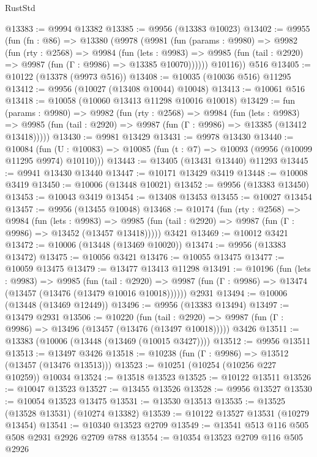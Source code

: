 \begin{lexlean}{RustStd}
\begin{coremodule}
@13383 := @9994 @13382
@13385 := @9956 (@13383 @10023)
@13402 := @9955
    (fun (fn : @86) =>
    @13380
      (@9978
        (@9981
          (fun (params : @9980) =>
          @9982
            (fun (rty : @2568) =>
            @9984
              (fun (lets : @9983) =>
              @9985 (fun (tail : @2920) => @9987 (fun (Γ : @9986) => @13385 @10070))))))
        @10116))
    @516
@13405 := @10122 (@13378 (@9973 @516))
@13408 := @10035 (@10036 @516) @11295
@13412 := @9956 (@10027 (@13408 @10044) @10048)
@13413 := @10061 @516
@13418 := @10058 (@10060 @13413 @11298 @10016 @10018)
@13429 := fun (params : @9980) =>
  @9982
    (fun (rty : @2568) =>
    @9984
      (fun (lets : @9983) =>
      @9985 (fun (tail : @2920) => @9987 (fun (Γ : @9986) => @13385 (@13412 @13418)))))
@13430 := @9981 @13429
@13431 := @9978 @13430
@13440 := @10084
    (fun (U : @10083) => @10085 (fun (t : @7) => @10093 (@9956 (@10099 @11295 @9974) @10110)))
@13443 := @13405 (@13431 @13440) @11293
@13445 := @9941 @13430 @13440
@13447 := @10171 @13429 @3419
@13448 := @10008 @3419
@13450 := @10006 (@13448 @10021)
@13452 := @9956 (@13383 @13450)
@13453 := @10043 @3419
@13454 := @13408 @13453
@13455 := @10027 @13454
@13457 := @9956 (@13455 @10048)
@13468 := @10174
    (fun (rty : @2568) =>
    @9984
      (fun (lets : @9983) =>
      @9985 (fun (tail : @2920) => @9987 (fun (Γ : @9986) => @13452 (@13457 @13418)))))
    @3421
@13469 := @10012 @3421
@13472 := @10006 (@13448 (@13469 @10020))
@13474 := @9956 (@13383 @13472)
@13475 := @10056 @3421
@13476 := @10055 @13475
@13477 := @10059 @13475
@13479 := @13477 @13413 @11298
@13491 := @10196
    (fun (lets : @9983) =>
    @9985
      (fun (tail : @2920) =>
      @9987 (fun (Γ : @9986) => @13474 (@13457 (@13476 (@13479 @10016 @10018))))))
    @2931
@13494 := @10006 (@13448 (@13469 @12449))
@13496 := @9956 (@13383 @13494)
@13497 := @13479 @2931
@13506 := @10220
    (fun (tail : @2920) => @9987 (fun (Γ : @9986) => @13496 (@13457 (@13476 (@13497 @10018)))))
    @3426
@13511 := @13383 (@10006 (@13448 (@13469 (@10015 @3427))))
@13512 := @9956 @13511
@13513 := @13497 @3426
@13518 := @10238 (fun (Γ : @9986) => @13512 (@13457 (@13476 @13513)))
@13523 := @10251 (@10254 (@10256 @227 @10259)) @10034
@13524 := @13518 @13523
@13525 := @10122 @13511
@13526 := @10047 @13523
@13527 := @13455 @13526
@13528 := @9956 @13527
@13530 := @10054 @13523 @13475
@13531 := @13530 @13513
@13535 := @13525 (@13528 @13531) (@10274 @13382)
@13539 := @10122 @13527 @13531 (@10279 @13454)
@13541 := @10340 @13523 @2709
@13549 := @13541 @513 @116 @505 @508 @2931 @2926 @2709 @788
@13554 := @10354 @13523 @2709 @116 @505 @2926

\end{coremodule}
\end{lexlean}
